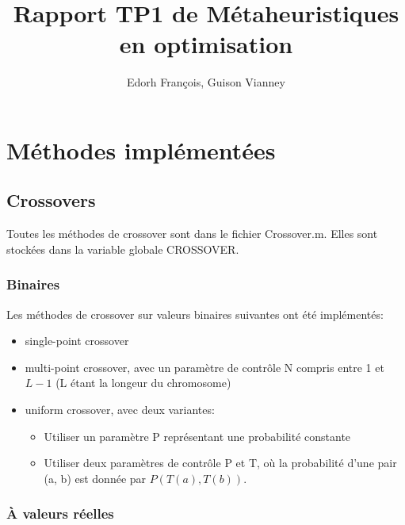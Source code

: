 \documentclass[12pt, letterpaper]{article}
\author{Edorh François, Guison Vianney}
\title{Rapport TP1 de Métaheuristiques en optimisation}
\begin{document}
\maketitle
\tableofcontents
\newpage

\section{Méthodes implémentées}

\subsection{Crossovers}

Toutes les méthodes de crossover sont dans le fichier Crossover.m.
Elles sont stockées dans la variable globale CROSSOVER.

\subsubsection{Binaires}

Les méthodes de crossover sur valeurs binaires suivantes ont été implémentés:
\begin{itemize}
\item single-point crossover\\
  
\item multi-point crossover, avec un paramètre de contrôle N compris
entre 1 et $L - 1$ (L étant la longeur du chromosome)\\
  
\item uniform crossover, avec deux variantes:
  \begin{itemize}
  \item Utiliser un paramètre P représentant une probabilité constante\\
    
  \item Utiliser deux paramètres de contrôle P et T, où la probabilité
    d'une pair (a, b) est donnée par $P(T(a), T(b))$.\\
    
  \end{itemize}
\end{itemize}

\subsubsection{À valeurs réelles}
\end{document}
